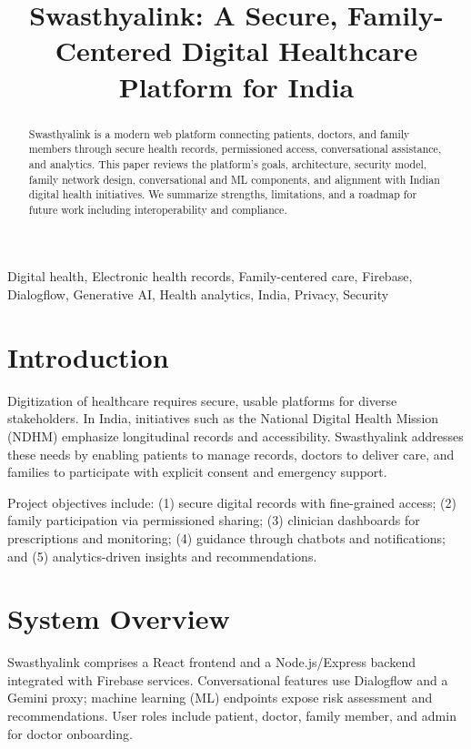 \documentclass[conference]{IEEEtran}
\begin{document}
\title{Swasthyalink: A Secure, Family-Centered Digital Healthcare Platform for India}

\author{
}

\maketitle

\begin{abstract}
Swasthyalink is a modern web platform connecting patients, doctors, and family members through secure health records, permissioned access, conversational assistance, and analytics. This paper reviews the platform's goals, architecture, security model, family network design, conversational and ML components, and alignment with Indian digital health initiatives. We summarize strengths, limitations, and a roadmap for future work including interoperability and compliance.
\end{abstract}

\begin{IEEEkeywords}
Digital health, Electronic health records, Family-centered care, Firebase, Dialogflow, Generative AI, Health analytics, India, Privacy, Security
\end{IEEEkeywords}

\section{Introduction}
Digitization of healthcare requires secure, usable platforms for diverse stakeholders. In India, initiatives such as the National Digital Health Mission (NDHM) emphasize longitudinal records and accessibility. Swasthyalink addresses these needs by enabling patients to manage records, doctors to deliver care, and families to participate with explicit consent and emergency support.

Project objectives include: (1) secure digital records with fine-grained access; (2) family participation via permissioned sharing; (3) clinician dashboards for prescriptions and monitoring; (4) guidance through chatbots and notifications; and (5) analytics-driven insights and recommendations.

\section{System Overview}
Swasthyalink comprises a React frontend and a Node.js/Express backend integrated with Firebase services. Conversational features use Dialogflow and a Gemini proxy; machine learning (ML) endpoints expose risk assessment and recommendations. User roles include patient, doctor, family member, and admin for doctor onboarding.
\end{document}
